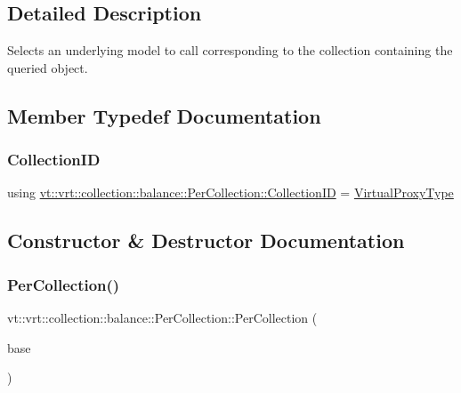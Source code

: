 \subsection{Detailed Description}
Selects an underlying model to call corresponding to the collection containing the queried object. 

\subsection{Member Typedef Documentation}
\mbox{\label{structvt_1_1vrt_1_1collection_1_1balance_1_1_per_collection_ade08a6857f727a0a9d1ef63b25fc5b71}} 
\subsubsection{\texorpdfstring{Collection\+ID}{CollectionID}}
{\footnotesize\ttfamily using \hyperlink{structvt_1_1vrt_1_1collection_1_1balance_1_1_per_collection_ade08a6857f727a0a9d1ef63b25fc5b71}{vt\+::vrt\+::collection\+::balance\+::\+Per\+Collection\+::\+Collection\+ID} =  \hyperlink{namespacevt_a1b417dd5d684f045bb58a0ede70045ac}{Virtual\+Proxy\+Type}}



\subsection{Constructor \& Destructor Documentation}
\mbox{\label{structvt_1_1vrt_1_1collection_1_1balance_1_1_per_collection_aa149a252fec1619bd947e53e3a66b854}} 
\subsubsection{\texorpdfstring{Per\+Collection()}{PerCollection()}}
{\footnotesize\ttfamily vt\+::vrt\+::collection\+::balance\+::\+Per\+Collection\+::\+Per\+Collection (\begin{DoxyParamCaption}\item[{std\+::shared\+\_\+ptr$<$ \hyperlink{structvt_1_1vrt_1_1collection_1_1balance_1_1_load_model}{Load\+Model} $>$}]{base }\end{DoxyParamCaption})\hspace{0.3cm}{\ttfamily [explicit]}}


